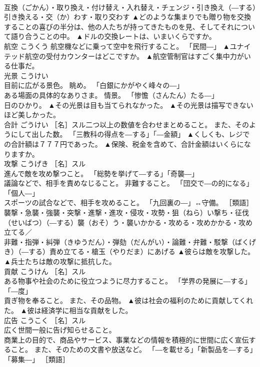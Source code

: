 \documentclass[8pt]{extreport}
\begin{document}
\begin{CJK}{UTF8}{min}
\\	互換（ごかん）・取り換え・付け替え・入れ替え・チェンジ・引き換え（―する）引き換える・交（か）わす・取り交わす	▲どのような集まりでも贈り物を交換することの喜びの半分は、他の人たちが持ってきたものを見、そしてそれについて語り合うことの中。 ▲ドルの交換レートは、いまいくらですか。
\\	航空	こうくう	航空機などに乗って空中を飛行すること。 「民間―」	▲ユナイテッド航空の受付カウンターはどこですか。 ▲航空管制官はすごく集中力がいる仕事だ。
\\	光景	こうけい	
\\	目前に広がる景色。 眺め。 「白銀にかがやく峰々の―」 
\\	ある場面の具体的なありさま。 情景。 「惨憺（さんたん）たる―」 
\\	日のひかり。	▲その光景は目も当てられなかった。 ▲その光景は描写できないほど美しかった。
\\	合計	ごうけい	［名］スル二つ以上の数値を合わせまとめること。 また、そのようにして出した数。 「三教科の得点を―する」「―金額」	▲くしくも、レジでの合計額は７７７円であった。 ▲保険、税金を含めて、合計金額はいくらになりますか。
\\	攻撃	こうげき	［名］スル 
\\	進んで敵を攻め撃つこと。 「総勢を挙げて―する」「奇襲―」 
\\	議論などで、相手を責めなじること。 非難すること。 「団交で―の的になる」「個人―」 
\\	スポーツの試合などで、相手を攻めること。 「九回裏の―」↔守備。 ［類語］
\\	襲撃・急襲・強襲・突撃・進撃・進攻・侵攻・攻勢・狙（ねら）い撃ち・征伐（せいばつ）（―する）襲（おそ）う・襲いかかる・攻める・攻めかかる・攻め立てる／
\\	非難・指弾・糾弾（きゆうだん）・弾劾（だんがい）・論難・弁難・駁撃（ばくげき）（―する）責め立てる・槍玉（やりだま）にあげる	▲彼らは敵を攻撃した。 ▲兵士たちは敵の攻撃に抵抗した。
\\	貢献	こうけん	［名］スル 
\\	ある物事や社会のために役立つように尽力すること。 「学界の発展に―する」「―度」 
\\	貢ぎ物を奉ること。 また、その品物。	▲彼は社会の福利のために貢献してくれた。 ▲彼は経済学に相当な貢献をした。
\\	広告	こうこく	［名］スル 
\\	広く世間一般に告げ知らせること。 
\\	商業上の目的で、商品やサービス、事業などの情報を積極的に世間に広く宣伝すること。 また、そのための文書や放送など。 「―を載せる」「新製品を―する」「募集―」 ［類語］

\end{CJK}
\end{document}
